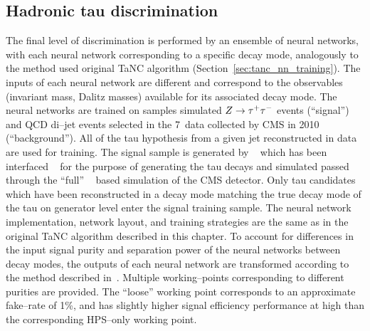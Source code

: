 \subsection{Hadronic tau discrimination}
%
The final level of discrimination is performed by an ensemble of neural
networks, with each neural network corresponding to a specific decay mode,
analogously to the method used original TaNC algorithm
(Section~\ref{sec:tanc_nn_training}).  The inputs of each neural network are
different and correspond to the observables (invariant mass, Dalitz masses)
available for its associated decay mode.  The neural networks are trained on
samples simulated $Z \to \tau^+\tau^-$ events (``signal'') and QCD di--jet events
selected in the 7~\TeV data collected by CMS in 2010 (``background'').  All of
the tau hypothesis from a given jet reconstructed in data are used for training.
The \ZTT signal sample is generated by \PYTHIA~\cite{pythia6_4}
which has been interfaced \TAUOLA~\cite{tauola} for the purpose of generating the
tau decays and simulated passed through the ``full'' \GEANT~\cite{geant} based
simulation of the CMS detector.  Only tau candidates which have been
reconstructed in a decay mode matching the true decay mode of the tau on
generator level enter the signal training sample.  The neural network
implementation, network layout, and training strategies are the same as in the
original TaNC algorithm described in this chapter.  To account for differences
in the input signal purity and separation power of the neural networks between
decay modes, the outputs of each neural network are transformed according to the
method described in~\cite{CMS_AN_2010-099}.  Multiple working--points
corresponding to different purities are provided.  The ``loose'' working point
corresponds to an approximate fake--rate of 1\%, and has slightly higher
signal efficiency performance at high \pt than the corresponding HPS--only
working point.


